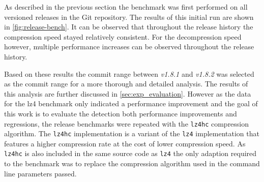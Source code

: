\documentclass[	runningheads,
				a4paper]{llncs}
\begin{document}
	As described in the previous section the benchmark was first performed on all versioned releases in the Git repository. The results of this initial run are shown in \autoref{fig:release-bench}. It can be observed that throughout the release history the compression speed stayed relatively consistent. For the decompression speed however, multiple performance increases can be observed throughout the release history. 

	Based on these results the commit range between \textit{v1.8.1} and \textit{v1.8.2} was selected as the commit range for a more thorough and detailed analysis. The results of this analysis are further discussed in \autoref{sec:exp_evaluation}. However as the data for the lz4 benchmark only indicated a performance improvement and the goal of this work is to evaluate the detection both performance improvements and regressions, the release benchmarks were repeated with the \texttt{lz4hc} compression algorithm. The \texttt{lz4hc} implementation is a variant of the \texttt{lz4} implementation that features a higher compression rate at the cost of lower compression speed. As \texttt{lz4hc} is also included in the same source code as \texttt{lz4} the only adaption required to the benchmark was to replace the compression algorithm used in the command line parameters passed.
\end{document}
